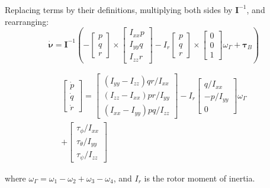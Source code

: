 Replacing terms by their definitions, multiplying both sides by $\boldsymbol{I}^{-1}$, and rearranging:
$$\boldsymbol{\dot{\nu}}=\boldsymbol{I}^{-1}\left(-\left[ \begin{array}{c}{p} \\ {q} \\ {r}\end{array}\right] \times \left[ \begin{array}{c}{I_{x x} p} \\ {I_{y y} q} \\ {I_{z z} r}\end{array}\right]-I_{r} \left[ \begin{array}{c}{p} \\ {q} \\ {r}\end{array}\right] \times \left[ \begin{array}{c}{0} \\ {0} \\ {1}\end{array}\right] \omega_{\Gamma}+\boldsymbol{\tau}_B\right)$$

$$
\begin{array}{c}
\left[ \begin{array}{c}{\dot{p}} \\ {\dot{q}} \\ {\dot{r}}\end{array}\right]= 
\left[ \begin{array}{c}{\left(I_{y y}-I_{z z}\right) q r / I_{x x}} \\ {\left(I_{z z}-I_{x x}\right) p r / I_{y y}} \\ {(I_{x x}-I_{y y}) p q / I_{z z}}\end{array}\right] 
- I_{r} \left[ \begin{array}{c}{q / I_{x x}} \\ {-p / I_{y y}} \\ {0}\end{array}\right] \omega_{\Gamma} \\
+ \left[ \begin{array}{c}{\tau_{\phi} / I_{x x}} \\ {\tau_{\theta} / I_{y y}} \\ {\tau_{\psi} / I_{z z}}\end{array}\right]
\end{array}
  $$

  where $\omega_\Gamma = \omega_1 - \omega_2 + \omega_3 - \omega_4$, and $I_r$ is the rotor moment of inertia.


